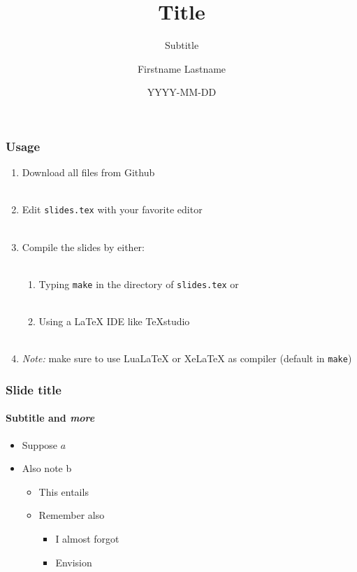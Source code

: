 \documentclass[aspectratio=1610]{beamer}
\title{Title}
\subtitle{Subtitle}
\author{Firstname Lastname}
\date{YYYY-MM-DD}
\institute{Center}
\begin{document}
\maketitle

\begin{frame}
    \frametitle{Usage}
    
    \begin{enumerate}
        \item Download all files from Github\\~
        \item Edit \texttt{slides.tex} with your favorite editor\\~
        \item Compile the slides by either:\\~
        \begin{enumerate}
            \item Typing \texttt{make} in the directory of \texttt{slides.tex} or\\~
            \item Using a LaTeX IDE like TeXstudio\\~
        \end{enumerate}
        \item \emph{Note:} make sure to use LuaLaTeX or XeLaTeX as compiler (default in \texttt{make})
    \end{enumerate}
\end{frame}

\begin{frame}
    \frametitle{Slide title}
    \framesubtitle{\textbf{Subtitle} and \emph{more}}
    
    \begin{itemize}
        \item Suppose $a$
        \item Also note b
        \begin{itemize}
            \item This entails
            \item Remember also
            \begin{itemize}
                \item I almost forgot
                \item Envision
            \end{itemize}
        \end{itemize}
    \end{itemize}
\end{frame}
\end{document}
